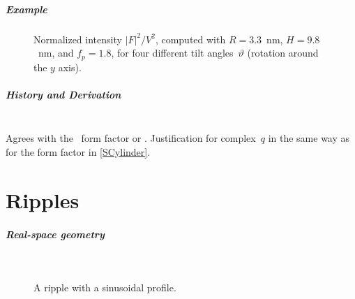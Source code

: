 \paragraph{Example}\strut

\begin{figure}[H]
\begin{center}
\end{center}
\caption{Normalized intensity $|F|^2/V^2$,
computed with $R=3.3$~nm, $H=9.8$~nm, and $f_p=1.8$,
for four different tilt angles~$\vartheta$ (rotation around the $y$ axis).}
\end{figure}

\paragraph{History and Derivation}\strut\\
Agrees with the \IsGISAXS\ form factor
 \cite[Eq.~2.33]{Laz06} or
 \cite[Eq.~228]{ReLL09}.
Justification for complex~$q$ in the same way as for the  form factor
in \cref{SCylinder}.



\chapter{Ripples}\label{SRipple}

 \label{SRipple1}

\paragraph{Real-space geometry}\strut\\

\begin{figure}[H]
\hfill
{}
\hfill
{}
\hfill
{}
\hfill
\caption{A ripple with a sinusoidal profile.}
\end{figure}

